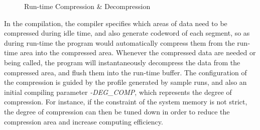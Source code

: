 \documentclass[]{article}
\begin{document}
\begin{figure}[H]
		\captionsetup{justification=centering}
		\caption{Run-time Compression \& Decompression}
		\label{fig:rtcd}
	\end{figure}
	In the compilation, the compiler specifies which areas of data need to be compressed during idle time, and also generate codeword of each segment, so as during run-time the program would automatically compress them from the run-time area into the compressed area. Whenever the compressed data are needed or being called, the program will instantaneously decompress the data from the compressed area, and flush them into the run-time buffer. The configuration of the compression is guided by the profile generated by sample runs, and also an initial compiling parameter \textit{-DEG\_COMP}, which represents the degree of compression. For instance, if the constraint of the system memory is not strict, the degree of compression can then be tuned down in order to reduce the compression area and increase computing efficiency.\par  
	
\end{document}
